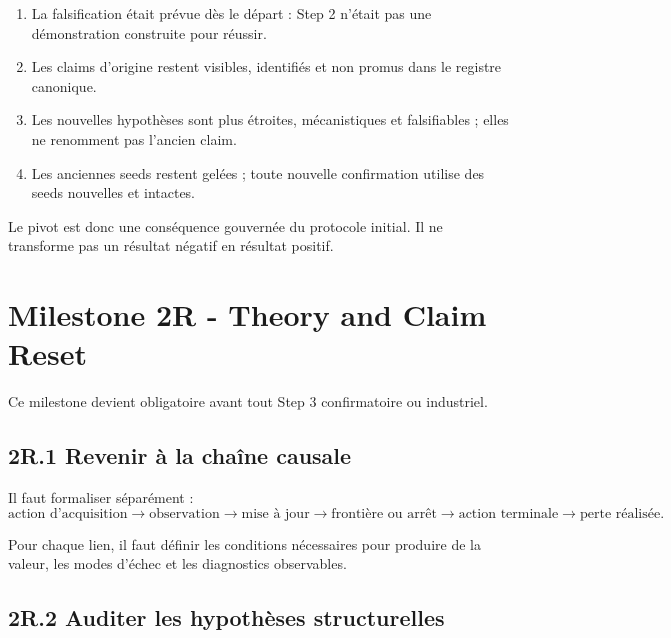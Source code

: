 \documentclass[11pt,a4paper]{article}
\begin{document}
\begin{enumerate}
  \item La falsification était prévue dès le départ : Step 2 n'était pas une démonstration construite pour réussir.
  \item Les claims d'origine restent visibles, identifiés et non promus dans le registre canonique.
  \item Les nouvelles hypothèses sont plus étroites, mécanistiques et falsifiables ; elles ne renomment pas l'ancien claim.
  \item Les anciennes seeds restent gelées ; toute nouvelle confirmation utilise des seeds nouvelles et intactes.
\end{enumerate}

Le pivot est donc une conséquence gouvernée du protocole initial. Il ne transforme pas un résultat négatif en résultat positif.

\section{Milestone 2R - Theory and Claim Reset}

Ce milestone devient obligatoire avant tout Step 3 confirmatoire ou industriel.

\subsection{2R.1 Revenir à la chaîne causale}

Il faut formaliser séparément :
\[
\text{action d'acquisition}\rightarrow\text{observation}\rightarrow\text{mise à jour}
\rightarrow\text{frontière ou arrêt}\rightarrow\text{action terminale}\rightarrow\text{perte réalisée}.
\]

Pour chaque lien, il faut définir les conditions nécessaires pour produire de la valeur, les modes d'échec et les diagnostics observables.

\subsection{2R.2 Auditer les hypothèses structurelles}
\end{document}

